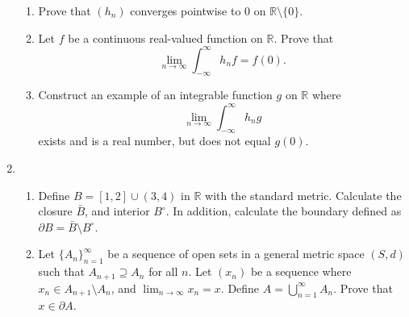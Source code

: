 \documentclass[12pt]{article}
\newcommand{\R}{\mathbb{R}}
\newcommand{\p}{\partial}
\begin{document}
\begin{enumerate}
\begin{enumerate}
      \item Prove that $(h_n)$ converges pointwise to $0$ on $\R \setminus \{0\}$.
      \item Let $f$ be a continuous real-valued function on $\R$.
	Prove that
	\[
	\lim_{n\to\infty} \int_{-\infty}^\infty h_n f = f(0).
	\]
      \item Construct an example of an integrable function $g$ on $\R$
	where
	\[
	\lim_{n\to\infty} \int_{-\infty}^\infty h_n g
	\]
	exists and is a real number, but does not equal $g(0)$.
    \end{enumerate}
  \item 
    \begin{enumerate}
      \item Define $B=[1,2]\cup(3,4)$ in $\R$ with the standard metric. Calculate
        the closure $\bar{B}$, and interior $B^\circ$. In addition, calculate
        the boundary defined as $\p B = \bar{B} \setminus B^\circ$.
      \item Let $\{A_n\}_{n=1}^\infty$ be a sequence of open sets in a general
        metric space $(S,d)$ such that $A_{n+1} \supseteq A_n$ for all $n$.
        Let $(x_n)$ be a sequence where $x_n \in A_{n+1} \setminus A_n$, and
        $\lim_{n\to\infty} x_n = x$. Define $A=\bigcup_{n=1}^\infty A_n$. Prove
        that $x \in \p A$.
    \end{enumerate}    
\end{enumerate}
\end{document}
